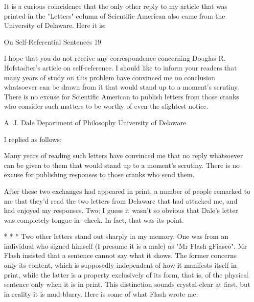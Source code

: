It is a curious coincidence that the only other reply to my article that was printed in the
"Letters" column of Scientific American also came from the University of Delaware. Here
it is:




On Self-Referential Sentences                                                              19

           I hope that you do not receive any correspondence concerning Douglas R.
   Hofstadter's article on self-reference. I should like to inform your readers that many
   years of study on this problem have convinced me no conclusion whatsoever can be
   drawn from it that would stand up to a moment's scrutiny. There is no excuse for
   Scientific American to publish letters from those cranks who consider such matters to
   be worthy of even the slightest notice.

                                                                                    A. J. Dale
                                                                     Department of Philosophy
                                                                       University of Delaware

I replied as follows:

          Many years of reading such letters have convinced me that no reply
   whatsoever can be given to them that would stand up to a moment's scrutiny. There is
   no excuse for publishing responses to those cranks who send them.

   After these two exchanges had appeared in print, a number of people remarked to me
that they'd read the two letters from Delaware that had attacked me, and had enjoyed my
responses. Two; I guess it wasn't so obvious that Dale's letter was completely tongue-in-
cheek. In fact, that was its point.

                                       *        *       *
         Two other letters stand out sharply in my memory. One was from an individual
who signed himself (I presume it is a male) as "Mr Flash gFiasco".
Mr Flash insisted that a sentence cannot say what it shows. The former concerns only its
content, which is supposedly independent of how it manifests itself in print, while the
latter is a property exclusively of its form, that is, of the physical sentence only when it is
in print. This distinction sounds crystal-clear at first, but in reality it is mud-blurry. Here
is some of what Flash wrote me:

